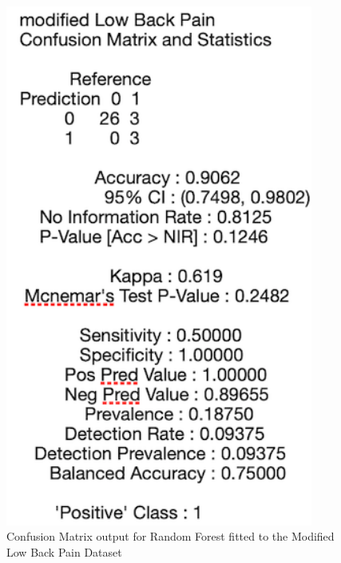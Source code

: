\begin{figure}[!htbp]
\begin{minipage}{0.45\textwidth}
        \includegraphics[width=0.9\textwidth]{ThesisTemplate/appendix/images/Chapter5Appendix/ConfusionMatrix/modLowBackPain.png} 
        \caption{Confusion Matrix output for Random Forest fitted to the Modified Low Back Pain Dataset}
        \label{fig:matrixmodLBP}
    \end{minipage}
\end{figure}


